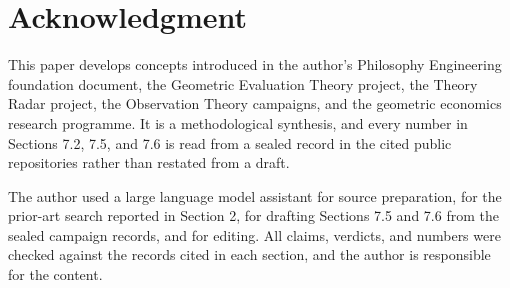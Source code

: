 \documentclass[11pt]{article}
\newif\ifanon
\theoremstyle{remark}
\begin{document}
\ifanon
\else
\section*{Acknowledgment}

This paper develops concepts introduced in the author's Philosophy Engineering
foundation document, the Geometric Evaluation Theory project, the Theory Radar
project, the Observation Theory campaigns, and the geometric economics research
programme. It is a methodological synthesis, and every number in Sections 7.2, 7.5,
and 7.6 is read from a sealed record in the cited public repositories rather than
restated from a draft.

The author used a large language model assistant for source preparation, for the
prior-art search reported in Section 2, for drafting Sections 7.5 and 7.6 from the
sealed campaign records, and for editing. All claims, verdicts, and numbers were
checked against the records cited in each section, and the author is responsible for
the content.
\fi



\end{document}
